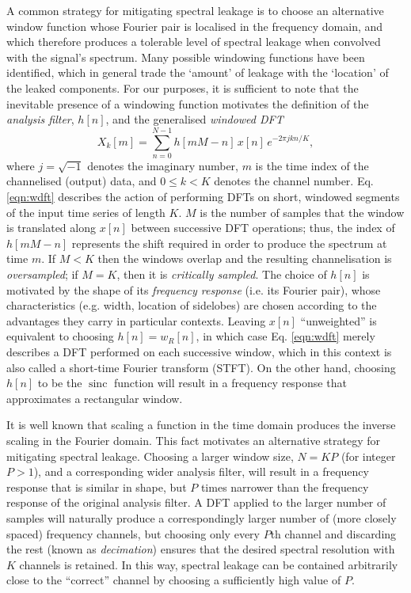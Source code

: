 \documentclass{pasa}%
\DeclareMathOperator{\sinc}{sinc}
\begin{document}
A common strategy for mitigating spectral leakage is to choose an alternative window function whose Fourier pair is localised in the frequency domain, and which therefore produces a tolerable level of spectral leakage when convolved with the signal's spectrum.
Many possible windowing functions have been identified, which in general trade the `amount' of leakage with the `location' of the leaked components.
For our purposes, it is sufficient to note that the inevitable presence of a windowing function motivates the definition of the \textit{analysis filter}, $h[n]$, and the generalised \textit{windowed DFT}
\begin{equation}
    X_k[m] = \sum_{n=0}^{N-1} h[mM - n]\,x[n]\,e^{-2\pi jkn/K},
    \label{eqn:wdft}
\end{equation}
where $j = \sqrt{-1}$ denotes the imaginary number, $m$ is the time index of the channelised (output) data, and $0 \le k < K$ denotes the channel number.
Eq. \eqref{eqn:wdft} describes the action of performing DFTs on short, windowed segments of the input time series of length $K$.
$M$ is the number of samples that the window is translated along $x[n]$ between successive DFT operations; thus, the index of $h[mM - n]$ represents the shift required in order to produce the spectrum at time $m$.
If $M < K$ then the windows overlap and the resulting channelisation is \textit{oversampled}; if $M = K$, then it is \textit{critically sampled}.
The choice of $h[n]$ is motivated by the shape of its \textit{frequency response} (i.e. its Fourier pair), whose characteristics (e.g. width, location of sidelobes) are chosen according to the advantages they carry in particular contexts.
Leaving $x[n]$ ``unweighted'' is equivalent to choosing $h[n] = w_R[n]$, in which case Eq. \eqref{eqn:wdft} merely describes a DFT performed on each successive window, which in this context is also called a short-time Fourier transform (STFT).
On the other hand, choosing $h[n]$ to be the $\sinc$ function will result in a frequency response that approximates a rectangular window.

It is well known that scaling a function in the time domain produces the inverse scaling in the Fourier domain.
This fact motivates an alternative strategy for mitigating spectral leakage.
Choosing a larger window size, $N = KP$ (for integer $P > 1$), and a corresponding wider analysis filter, will result in a frequency response that is similar in shape, but $P$ times narrower than the frequency response of the original analysis filter.
A DFT applied to the larger number of samples will naturally produce a correspondingly larger number of (more closely spaced) frequency channels, but choosing only every $P$th channel and discarding the rest (known as \textit{decimation}) ensures that the desired spectral resolution with $K$ channels is retained.
In this way, spectral leakage can be contained arbitrarily close to the ``correct'' channel by choosing a sufficiently high value of $P$.
\end{document}
